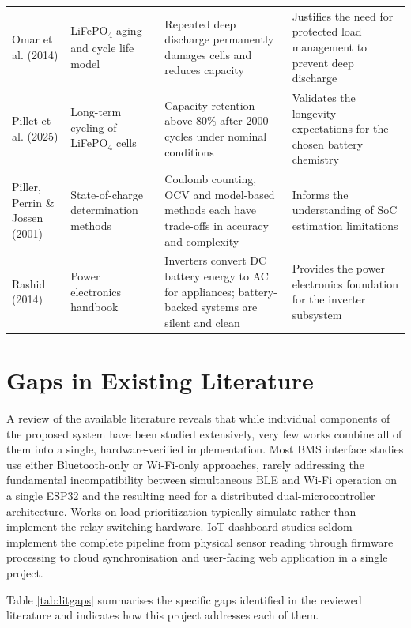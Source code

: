 \documentclass[12pt, a4paper]{report}
\begin{document}
\begin{longtable}{L{2.8cm} L{3.5cm} L{4.5cm} L{3.5cm}}
Omar et al. (2014) & LiFePO\textsubscript{4} aging and cycle life model & Repeated deep discharge permanently damages cells and reduces capacity & Justifies the need for protected load management to prevent deep discharge \\

Pillet et al. (2025) & Long-term cycling of LiFePO\textsubscript{4} cells & Capacity retention above 80\% after 2000 cycles under nominal conditions & Validates the longevity expectations for the chosen battery chemistry \\

Piller, Perrin \& Jossen (2001) & State-of-charge determination methods & Coulomb counting, OCV and model-based methods each have trade-offs in accuracy and complexity & Informs the understanding of SoC estimation limitations \\

Rashid (2014) & Power electronics handbook & Inverters convert DC battery energy to AC for appliances; battery-backed systems are silent and clean & Provides the power electronics foundation for the inverter subsystem \\

\end{longtable}

\section{Gaps in Existing Literature}

A review of the available literature reveals that while individual
components of the proposed system have been studied extensively, very few
works combine all of them into a single, hardware-verified implementation.
Most BMS interface studies use either Bluetooth-only or Wi-Fi-only
approaches, rarely addressing the fundamental incompatibility between
simultaneous BLE and Wi-Fi operation on a single ESP32 and the resulting
need for a distributed dual-microcontroller architecture. Works on load
prioritization typically simulate rather than implement the relay switching
hardware. IoT dashboard studies seldom implement the complete pipeline
from physical sensor reading through firmware processing to cloud
synchronisation and user-facing web application in a single project.

Table \ref{tab:litgaps} summarises the specific gaps identified in the
reviewed literature and indicates how this project addresses each of them.
\end{document}
